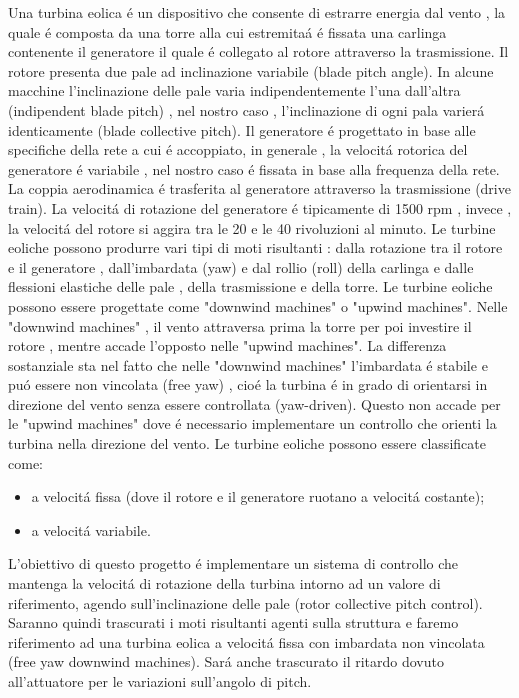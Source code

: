 \documentclass[a4paper,13pt]{article}
\begin{document}
Una turbina eolica \'e un dispositivo che consente di estrarre energia dal vento , la quale \'e composta da una torre alla cui estremita\'a \'e fissata una carlinga contenente il generatore il quale \'e collegato al rotore attraverso la trasmissione.
Il rotore presenta due pale ad inclinazione variabile (blade pitch angle).
In alcune macchine l'inclinazione delle pale varia indipendentemente l'una dall'altra (indipendent blade pitch) , nel nostro caso , l'inclinazione di ogni pala varier\'a identicamente (blade collective pitch).
Il generatore \'e progettato in base alle specifiche della rete a cui \'e accoppiato, in generale , la velocit\'a rotorica del generatore \'e variabile , nel nostro caso \'e fissata in base alla frequenza della rete.
La coppia aerodinamica \'e trasferita al generatore attraverso la trasmissione (drive train).
La velocit\'a di rotazione del generatore \'e tipicamente di 1500 rpm , invece , la velocit\'a del rotore si aggira tra le 20 e le 40 rivoluzioni al minuto.
Le turbine eoliche possono produrre vari tipi di moti risultanti : dalla rotazione tra il rotore e il generatore , dall'imbardata (yaw) e dal rollio (roll) della carlinga e dalle flessioni elastiche delle pale , della trasmissione e della torre.
Le turbine eoliche possono essere progettate come "downwind machines" o "upwind machines".
Nelle "downwind machines" , il vento attraversa prima la torre per poi investire il rotore , mentre accade l'opposto nelle "upwind machines".
La differenza sostanziale sta nel fatto che nelle "downwind machines" l'imbardata \'e stabile e pu\'o essere non vincolata (free yaw) , cio\'e la turbina \'e in grado di orientarsi in direzione del vento senza essere controllata (yaw-driven).
Questo non accade per le "upwind machines" dove \'e necessario implementare un controllo che orienti la turbina nella direzione del vento.
Le turbine eoliche possono essere classificate come:
\begin{itemize}
\item a velocit\'a fissa (dove il rotore e il generatore ruotano a velocit\'a costante);
\item a velocit\'a variabile.
\end{itemize}
L'obiettivo di questo progetto \'e implementare un sistema di controllo che mantenga la velocit\'a di rotazione della turbina intorno ad un valore di riferimento, agendo sull'inclinazione delle pale (rotor collective pitch control).
Saranno quindi trascurati i moti risultanti agenti sulla struttura e faremo riferimento ad una turbina eolica a velocit\'a fissa con imbardata non vincolata (free yaw downwind machines).
Sar\'a anche trascurato il ritardo dovuto all'attuatore per le variazioni sull'angolo di pitch.
\end{document}
